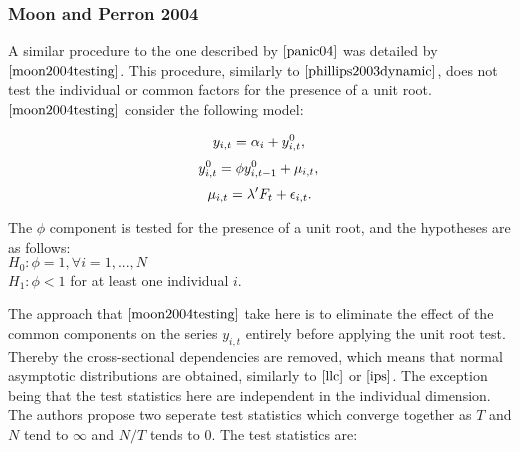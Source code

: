 


\subsubsection{Moon and Perron 2004}

A similar procedure to the one described by $\cite{panic04}$ was detailed by $\cite{moon2004testing}$. This procedure, similarly to $\cite{phillips2003dynamic}$, does not test the individual or common factors for the presence of a unit root. $\cite{moon2004testing}$ consider the following model:

\begin{equation}
y_{i,t} = \alpha_i + y_{i,t}^0 ,\\
\end{equation}
\begin{equation}
y_{i,t}^0 = \phi  y_{i,t-1}^0 + \mu_{i,t} ,\\
\end{equation}
\begin{equation}
\mu_{i,t} = \lambda' F_t + \epsilon_{i,t} .\\
\end{equation}

The $\phi$ component is tested for the presence of a unit root, and the hypotheses are as follows: \\
\linebreak
$H_0 : \phi = 1, \forall i = 1, ..., N$ \\
$H_1 : \phi < 1$ for at least one individual $i$. \\
\linebreak

The approach that $\cite{moon2004testing}$ take here is to eliminate the effect of the common components on the series $y_{i,t}$ entirely before applying the unit root test. Thereby the cross-sectional dependencies are removed, which means that normal asymptotic distributions are obtained, similarly to $\cite{llc}$ or $\cite{ips}$. The exception being that the test statistics here are independent in the individual dimension. The authors propose two seperate test statistics which converge together as $T$ and $N$ tend to $\infty$ and $N/T$ tends to $0$. The test statistics are:

